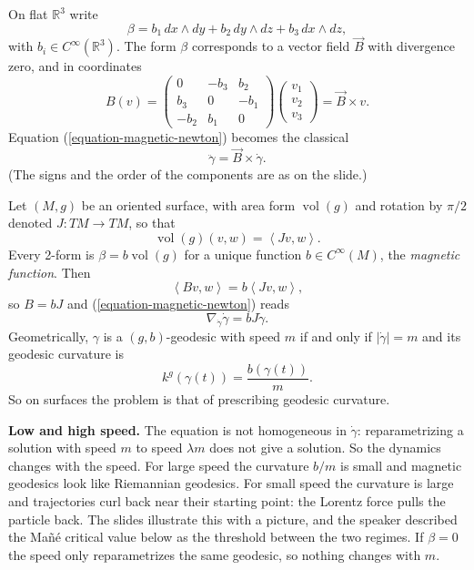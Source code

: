 \begin{example}
\label{example-magnetic-r3}
On flat $\mathbb{R}^3$ write
$$
\beta = b_1\, dx\wedge dy
+ b_2\, dy\wedge dz
+ b_3\, dx\wedge dz,
$$
with $b_i \in C^\infty(\mathbb{R}^3)$. The
form $\beta$ corresponds to a vector field
$\vec{B}$ with divergence zero, and in
coordinates
$$
B(v) =
\begin{pmatrix}
0 & -b_3 & b_2 \\
b_3 & 0 & -b_1 \\
-b_2 & b_1 & 0
\end{pmatrix}
\begin{pmatrix}
v_1 \\ v_2 \\ v_3
\end{pmatrix}
= \vec{B} \times v.
$$
Equation (\ref{equation-magnetic-newton})
becomes the classical
$$
\ddot\gamma = \vec{B} \times \dot\gamma.
$$
(The signs and the order of the components
are as on the slide.)
\end{example}

\begin{example}
\label{example-magnetic-surface}
Let $(M,g)$ be an oriented surface, with
area form $\operatorname{vol}(g)$ and
rotation by $\pi/2$ denoted
$J : TM \to TM$, so that
$$
\operatorname{vol}(g)(v,w)
= \left\langle{} Jv,w \right\rangle{}.
$$
Every 2-form is $\beta = b
\operatorname{vol}(g)$ for a unique function
$b \in C^\infty(M)$, the \emph{magnetic
function}. Then
$$
\left\langle{} Bv,w \right\rangle{}
= b \left\langle{} Jv,w \right\rangle{},
$$
so $B = bJ$ and
(\ref{equation-magnetic-newton}) reads
$$
\nabla_{\dot\gamma}\dot\gamma
= b J\dot\gamma.
$$
Geometrically, $\gamma$ is a
$(g,b)$-geodesic with speed $m$ if and only
if $|\dot\gamma| = m$ and its geodesic
curvature is
$$
k^g(\gamma(t)) = \frac{b(\gamma(t))}{m}.
$$
So on surfaces the problem is that of
prescribing geodesic curvature.
\end{example}

\medskip\noindent
{\bf Low and high speed.} The equation is
not homogeneous in $\dot\gamma$:
reparametrizing a solution with speed $m$ to
speed $\lambda m$ does not give a solution.
So the dynamics changes with the speed. For
large speed the curvature $b/m$ is small and
magnetic geodesics look like Riemannian
geodesics. For small speed the curvature is
large and trajectories curl back near their
starting point: the Lorentz force pulls the
particle back. The slides illustrate this
with a picture, and the speaker described
the Mañé critical value below as the
threshold between the two regimes. If
$\beta = 0$ the speed only reparametrizes
the same geodesic, so nothing changes with
$m$.

